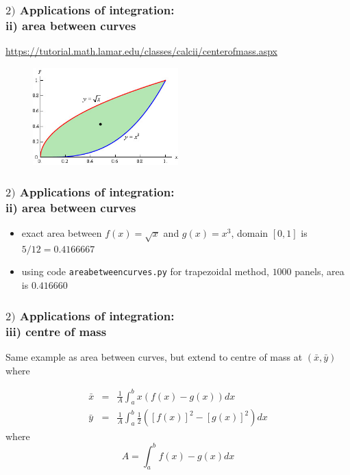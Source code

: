 \documentclass[english,14pt]{beamer}
\begin{document}

\begin{frame}[fragile]

\frametitle{$2)$ Applications of integration: \\ \qquad ii) area between curves}

	{\small
\href{https://tutorial.math.lamar.edu/classes/calcii/centerofmass.aspx}{https://tutorial.math.lamar.edu/classes/calcii/centerofmass.aspx}}

\begin{figure}[ht]
	\centering
	\includegraphics[width=0.5\textwidth]{figures/centreofmassexample}
\end{figure}

\end{frame}


\begin{frame}[fragile]

\frametitle{$2)$ Applications of integration: \\ \qquad ii) area between curves}

\begin{itemize}
	\item exact area between $f(x) = \sqrt{x}$ and $g(x) = x^3$, domain $[0,1]$ is $5/12 = 0.4166667$
	\item using code \texttt{areabetweencurves.py} for trapezoidal method, $1000$ panels, area is $0.416660$
\end{itemize}

\end{frame}


\begin{frame}[fragile]

\frametitle{$2)$ Applications of integration: \\ \qquad iii) centre of mass}

Same example as area between curves, but extend to centre of mass at $(\bar{x},\bar{y})$ where

\begin{eqnarray*}
\bar{x} & = & \frac{1}{A} \int_a^b x\left( f(x) - g(x)\right) dx \\
\bar{y} & = & \frac{1}{A} \int_a^b \frac{1}{2} \left( [f(x)]^2 - [g(x)]^2\right) dx
\end{eqnarray*}
where
\[
A = \int_a^b f(x) - g(x) dx
\]

\end{frame}
\end{document}

